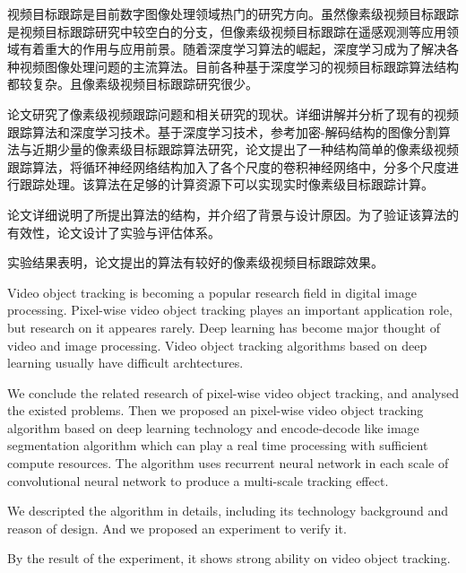 
\begin{cabstract}
	视频目标跟踪是目前数字图像处理领域热门的研究方向。虽然像素级视频目标跟踪是视频目标跟踪研究中较空白的分支，但像素级视频目标跟踪在遥感观测等应用领域有着重大的作用与应用前景。随着深度学习算法的崛起，深度学习成为了解决各种视频图像处理问题的主流算法。目前各种基于深度学习的视频目标跟踪算法结构都较复杂。且像素级视频目标跟踪研究很少。
	\par
	论文研究了像素级视频跟踪问题和相关研究的现状。详细讲解并分析了现有的视频跟踪算法和深度学习技术。基于深度学习技术，参考加密-解码结构的图像分割算法与近期少量的像素级目标跟踪算法研究，论文提出了一种结构简单的像素级视频跟踪算法，将循环神经网络结构加入了各个尺度的卷积神经网络中，分多个尺度进行跟踪处理。该算法在足够的计算资源下可以实现实时像素级目标跟踪计算。
	\par
	论文详细说明了所提出算法的结构，并介绍了背景与设计原因。为了验证该算法的有效性，论文设计了实验与评估体系。
	\par
	实验结果表明，论文提出的算法有较好的像素级视频目标跟踪效果。
\end{cabstract}

\begin{eabstract} %
	Video object tracking is becoming a popular research field in digital image processing. Pixel-wise video object tracking playes an important application role, but research on it appeares rarely. Deep learning has become major thought of video and image processing. Video object tracking algorithms based on deep learning usually have difficult archtectures. 
	\par
	We conclude the related research of pixel-wise video object tracking, and analysed the existed problems. Then we proposed an pixel-wise video object tracking algorithm based on deep learning technology and encode-decode like image segmentation algorithm which can play a real time processing with sufficient compute resources. The algorithm uses recurrent neural network in each scale of convolutional neural network to produce a multi-scale tracking effect.
	\par
	We descripted the algorithm in details, including its technology background and reason of design. And we proposed an experiment to verify it.
	\par
	By the result of the experiment, it shows strong ability on video object tracking.
\end{eabstract}

